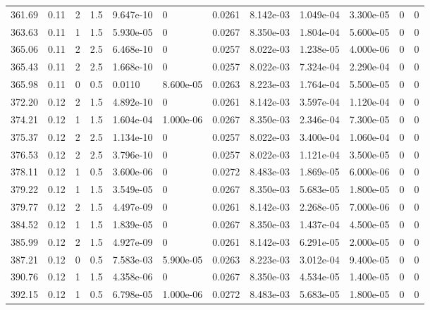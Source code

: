 \documentclass[preview]{standalone}
\begin{document}
{{{\begin{tabular}{L{1.2cm}C{1.2cm} C{0.3cm}C{0.5cm} C{1.4cm}C{1.4cm} C{1.4cm}C{1.4cm} C{1.6cm}C{1.6cm} C{1.6cm}C{1.6cm}}
  361.69  &  0.11  & 2     & 1.5 &  9.647e-10  & 0  &  0.0261&   8.142e-03& 1.049e-04 & 3.300e-05   &  0 & 0  \\ 
  363.63  &  0.11  & 1     & 1.5 &  5.930e-05  & 0  &  0.0267&   8.350e-03& 1.804e-04 & 5.600e-05   &  0 & 0  \\ 
  365.06  &  0.11  & 2     & 2.5 &  6.468e-10  & 0  &  0.0257&   8.022e-03& 1.238e-05 & 4.000e-06   &  0 & 0  \\ 
  365.43  &  0.11  & 2     & 2.5 &  1.668e-10  & 0  &  0.0257&   8.022e-03& 7.324e-04 & 2.290e-04   &  0 & 0  \\ 
  365.98  &  0.11  & 0     & 0.5 &  0.0110  & 8.600e-05  &  0.0263&   8.223e-03& 1.764e-04 & 5.500e-05   &  0 & 0  \\ 
  372.20  &  0.12  & 2     & 1.5 &  4.892e-10  & 0  &  0.0261&   8.142e-03& 3.597e-04 & 1.120e-04   &  0 & 0  \\ 
  374.21  &  0.12  & 1     & 1.5 &  1.604e-04  & 1.000e-06  &  0.0267&   8.350e-03& 2.346e-04 & 7.300e-05   &  0 & 0  \\ 
  375.37  &  0.12  & 2     & 2.5 &  1.134e-10  & 0  &  0.0257&   8.022e-03& 3.400e-04 & 1.060e-04   &  0 & 0  \\ 
  376.53  &  0.12  & 2     & 2.5 &  3.796e-10  & 0  &  0.0257&   8.022e-03& 1.121e-04 & 3.500e-05   &  0 & 0  \\ 
  378.11  &  0.12  & 1     & 0.5 &  3.600e-06  & 0  &  0.0272&   8.483e-03& 1.869e-05 & 6.000e-06   &  0 & 0  \\ 
  379.22  &  0.12  & 1     & 1.5 &  3.549e-05  & 0  &  0.0267&   8.350e-03& 5.683e-05 & 1.800e-05   &  0 & 0  \\ 
  379.77  &  0.12  & 2     & 1.5 &  4.497e-09  & 0  &  0.0261&   8.142e-03& 2.268e-05 & 7.000e-06   &  0 & 0  \\ 
  384.52  &  0.12  & 1     & 1.5 &  1.839e-05  & 0  &  0.0267&   8.350e-03& 1.437e-04 & 4.500e-05   &  0 & 0  \\ 
  385.99  &  0.12  & 2     & 1.5 &  4.927e-09  & 0  &  0.0261&   8.142e-03& 6.291e-05 & 2.000e-05   &  0 & 0  \\ 
  387.21  &  0.12  & 0     & 0.5 &  7.583e-03  & 5.900e-05  &  0.0263&   8.223e-03& 3.012e-04 & 9.400e-05   &  0 & 0  \\ 
  390.76  &  0.12  & 1     & 1.5 &  4.358e-06  & 0  &  0.0267&   8.350e-03& 4.534e-05 & 1.400e-05   &  0 & 0  \\ 
  392.15  &  0.12  & 1     & 0.5 &  6.798e-05  & 1.000e-06  &  0.0272&   8.483e-03& 5.683e-05 & 1.800e-05   &  0 & 0  \\ 

\end{tabular}}}}
\end{document}
